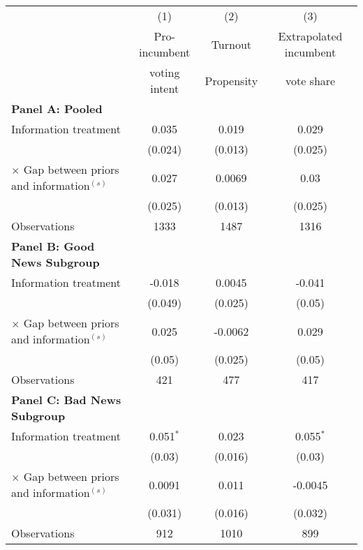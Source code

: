 
    \begin{center}
    \begin{tabular}{l c c c }
    \hline
    &(1)&(2)&(3)\\
    &Pro-incumbent&Turnout &Extrapolated incumbent\\
    &voting intent& Propensity&vote share\\
    \hline
    \textbf{Panel A: Pooled}\\
    \hline
    Information treatment&0.035&0.019&0.029\\
    &(0.024)&(0.013)&(0.025)\\
    $\times$ Gap between priors and information$^{(s)}$ &0.027&0.0069&0.03\\
    &(0.025)&(0.013)&(0.025)\\
    Observations&1333&1487&1316\\
    \hline
    \textbf{Panel B: Good News Subgroup}\\
    \hline
    Information treatment&-0.018&0.0045&-0.041\\
    &(0.049)&(0.025)&(0.05)\\
    $\times$ Gap between priors and information$^{(s)}$ &0.025&-0.0062&0.029\\
    &(0.05)&(0.025)&(0.05)\\
    Observations&421&477&417\\
    \hline
    \textbf{Panel C: Bad News Subgroup}\\
    \hline
    Information treatment&0.051$^{*}$&0.023&0.055$^{*}$\\
    &(0.03)&(0.016)&(0.03)\\
    $\times$ Gap between priors and information$^{(s)}$ &0.0091&0.011&-0.0045\\
    &(0.031)&(0.016)&(0.032)\\
    Observations&912&1010&899\\
    \hline\hline
    \end{tabular}
    \end{center}
